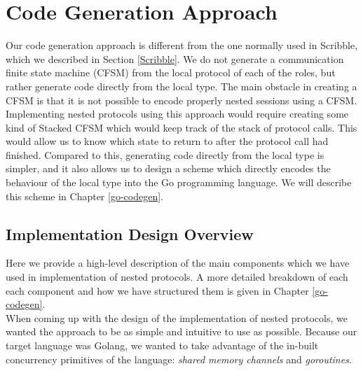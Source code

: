 \documentclass[12pt,twoside]{report}
\begin{document}


\section{Code Generation Approach}\label{codegen-approach}
Our code generation approach is different from the one normally used in Scribble, which we described in Section \ref{Scribble}. We do not generate a communication finite state machine (CFSM) from the local protocol of each of the roles, but rather generate code directly from the local type. The main obstacle in creating a CFSM is that it is not possible to encode properly nested sessions using a CFSM. Implementing nested protocols using this approach would require creating some kind of Stacked CFSM which would keep track of the stack of protocol calls. This would allow us to know which state to return to after the protocol call had finished. Compared to this, generating code directly from the local type is simpler, and it also allows us to design a scheme which directly encodes the behaviour of the local type into the Go programming language. We will describe this scheme in Chapter \ref{go-codegen}.

\subsection{Implementation Design Overview}\label{design-overview}
Here we provide a high-level description of the main components which we have used in implementation of nested protocols. A more detailed breakdown of each each component and how we have structured them is given in Chapter \ref{go-codegen}. \\

When coming up with the design of the implementation of nested protocols, we wanted the approach to be as simple and intuitive to use as possible. Because our target language was Golang, we wanted to take advantage of the in-built concurrency primitives of the language: \textit{shared memory channels} and \textit{goroutines}.
\end{document}
